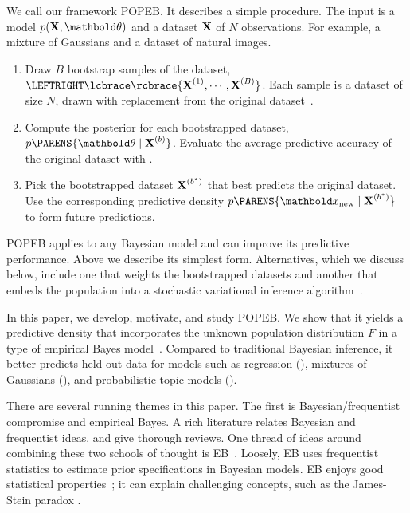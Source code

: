We call our framework \gls{POPEB}. It describes a simple procedure.
The input is a model $p(\mbX,\mbtheta)$ and a dataset $\textbf{X}$ of
$N$ observations. For example, a mixture of Gaussians and a dataset of natural
images.
\begin{enumerate}
\item Draw $B$ bootstrap samples of the dataset,
  $\LEFTRIGHT\lcbrace\rcbrace{\mbX^{(1)}, \cdots, \mbX^{(B)}}$.
  Each sample is a dataset of
  size $N$, drawn with replacement from the original
  dataset~\citep{efron1994introduction}.
\item Compute the posterior for each bootstrapped dataset,
  $p\PARENS{\mbtheta \mid \mbX^{(b)}}$.  Evaluate the average predictive
  accuracy of the original dataset with .
\item Pick the bootstrapped dataset $\textbf{X}^{(b^*)}$ that best predicts
  the original dataset.  Use the corresponding predictive density
  $p\PARENS{\xnew \mid \mbX^{(b^*)}}$ to form future predictions.
\end{enumerate}

\gls{POPEB} applies to any Bayesian model and can
improve its predictive performance.  Above we describe its
simplest form.  Alternatives, which we discuss below, include one that
weights the bootstrapped datasets and another that embeds the population
into a stochastic variational inference
algorithm~\citep{hoffman2013stochastic}.

In this paper, we develop, motivate, and study \gls{POPEB}.
We show that it yields a predictive density
that incorporates the unknown population distribution $F$ in a type of
empirical Bayes model~\citep{robbins1955empirical,robbins1964empirical}.
Compared to traditional Bayesian inference, it
better predicts held-out data for models such as regression
(), mixtures of Gaussians
(), and probabilistic topic models
().

There are several running themes in this paper.  The first is
Bayesian/frequentist compromise and empirical Bayes.  A rich
literature relates Bayesian and frequentist ideas.
\citet{bayarri2004interplay} and \citet{aitkin2010statistical} give
thorough reviews.  One thread of ideas around combining these two
schools of thought is
\gls{EB}~\citep{robbins1955empirical,morris1983parametric,carlin2000bayes}.
Loosely, \gls{EB} uses frequentist statistics to
estimate prior specifications in Bayesian models.  \gls{EB} enjoys
good statistical properties~\citep{efron2010large}; it can explain
challenging concepts, such as the James-Stein paradox
\citep{berger1985statistical}.

